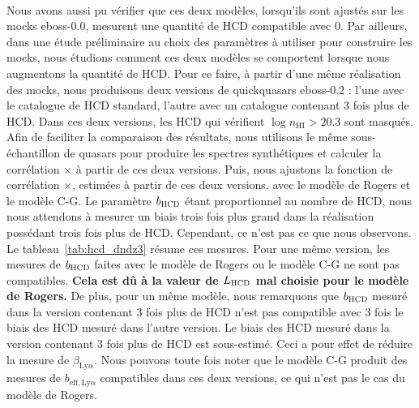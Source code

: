 \paragraph{}
Nous avons aussi pu vérifier que ces deux modèles, lorsqu'ils sont ajustés sur les mocks eboss-0.0, mesurent une quantité de HCD compatible avec 0.
Par ailleurs, dans une étude préliminaire au choix des paramètres \lya{} à utiliser pour construire les mocks, nous étudions comment ces deux modèles se comportent lorsque nous augmentons la quantité de HCD.
Pour ce faire, à partir d'une même réalisation des mocks, nous produisons deux versions de quickquasars eboss-0.2 : l'une avec le catalogue de HCD standard, l'autre avec un catalogue contenant 3 fois plus de HCD. Dans ces deux versions, les HCD qui vérifient $\log n_{\mathrm{HI}} > \num{20.3}$ sont masqués. Afin de faciliter la comparaison des résultats, nous utilisons le même sous-échantillon de quasars pour produire les spectres synthétiques et calculer la corrélation \lya{}$\times$\lya{} à partir de ces deux versions.
Puis, nous ajustons la fonction de corrélation \lya{}$\times$\lya{}, estimées à partir de ces deux versions, avec le modèle de Rogers et le modèle C-G. Le paramètre $b_{\textsc{HCD}} $ étant proportionnel au nombre de HCD, nous nous attendons à mesurer un biais trois fois plus grand dans la réalisation possédant trois fois plus de HCD.
Cependant, ce n'est pas ce que nous observons. Le tableau~\ref{tab:hcd_dndz3} résume ces mesures.
Pour une même version, les mesures de $b_{\textsc{HCD}}$ faites avec le modèle de Rogers ou le modèle C-G ne sont pas compatibles.
\textbf{Cela est dû à la valeur de $L_{\textsc{HCD}}$ mal choisie pour le modèle de Rogers.}
De plus, pour un même modèle, nous remarquons que $b_{\textsc{HCD}}$  mesuré dans la version contenant 3 fois plus de HCD n'est pas compatible avec 3 fois le biais des HCD mesuré dans l'autre version. Le biais des HCD mesuré dans la version contenant 3 fois plus de HCD est sous-estimé.
Ceci a pour effet de réduire la mesure de $\beta_{\mathrm{Ly}\alpha}$.
Nous pouvons toute fois noter que le modèle C-G produit des mesures de $b_{\mathrm{eff},\mathrm{Ly}\alpha}$ compatibles dans ces deux versions, ce qui n'est pas le cas du modèle de Rogers.

